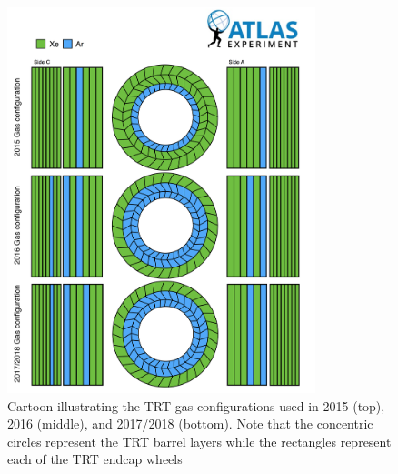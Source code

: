 \begin{figure}[tbp]
  \centering
  \includegraphics[width=0.80\textwidth]{figs/egamma/TRTGasConfig.png}
  \caption[Cartoon illustrating the TRT gas configurations used in 2015 (top), 2016 (middle), and 2017/2018 (bottom).]{Cartoon illustrating the TRT gas configurations used in 2015 (top), 2016 (middle), and 2017/2018 (bottom). 
  Note that the concentric circles represent the TRT barrel layers while the rectangles represent each of the TRT endcap wheels \cite{TRTgas20152016}}
  \label{fig:egamma:TRTGas}
\end{figure}


